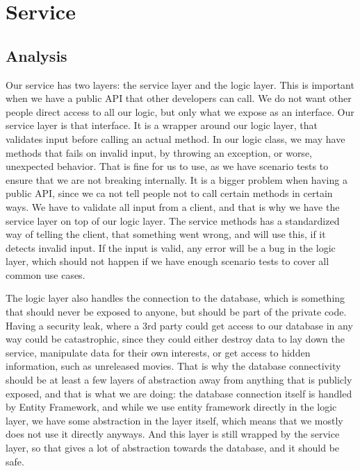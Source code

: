 \section{Service}
\label{Design_Service}

\subsection{Analysis}
\label{Design_Service_Analysis}

Our service has two layers: the service layer and the logic layer. This is important when we have a public API that other developers can call. We do not want other people direct access to all our logic, but only what we expose as an interface. Our service layer is that interface. It is a wrapper around our logic layer, that validates input before calling an actual method. In our logic class, we may have methods that fails on invalid input, by throwing an exception, or worse, unexpected behavior. That is fine for us to use, as we have scenario tests to ensure that we are not breaking internally. It is a bigger problem when having a public API, since we ca not tell people not to call certain methods in certain ways. We have to validate all input from a client, and that is why we have the service layer on top of our logic layer. The service methods has a standardized way of telling the client, that something went wrong, and will use this, if it detects invalid input. If the input is valid, any error will be a bug in the logic layer, which should not happen if we have enough scenario tests to cover all common use cases. 

The logic layer also handles the connection to the database, which is something that should never be exposed to anyone, but should be part of the private code. Having a security leak, where a 3rd party could get access to our database in any way could be catastrophic, since they could either destroy data to lay down the service, manipulate data for their own interests, or get access to hidden information, such as unreleased movies. That is why the database connectivity should be at least a few layers of abstraction away from anything that is publicly exposed, and that is what we are doing: the database connection itself is handled by Entity Framework, and while we use entity framework directly in the logic layer, we have some abstraction in the layer itself, which means that we mostly does not use it directly anyways. And this layer is still wrapped by the service layer, so that gives a lot of abstraction towards the database, and it should be safe. 

